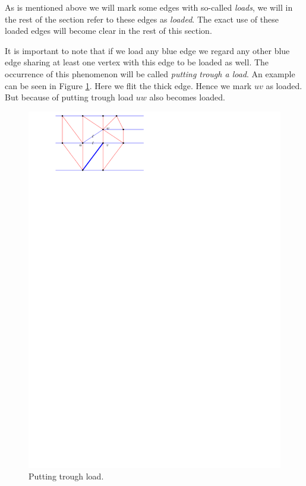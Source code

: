  As is mentioned above we will mark some edges with so-called \emph{loads}, we will in the rest of the section refer to these edges as \emph{loaded}.
  The exact use of these loaded edges will become clear in the rest of this section.

  It is important to note that if we load any blue edge we regard any other blue edge sharing at least one vertex with this edge to be loaded as well. The occurrence of this phenomenon will be called \emph{putting trough a load}. An example can be seen in Figure \ref{fig:subdiv:putTrougLoad}. Here we flit the thick edge. Hence we mark $uv$ as loaded. But because of putting trough load $uw$ also becomes loaded.

  \begin{figure}[h]
    \centering
    \includegraphics[scale=1]{blueFaceSubdivision/img/puttingTroughLoad.pdf}
    \caption{Putting trough load.}
    \label{fig:subdiv:putTrougLoad}
  \end{figure}



